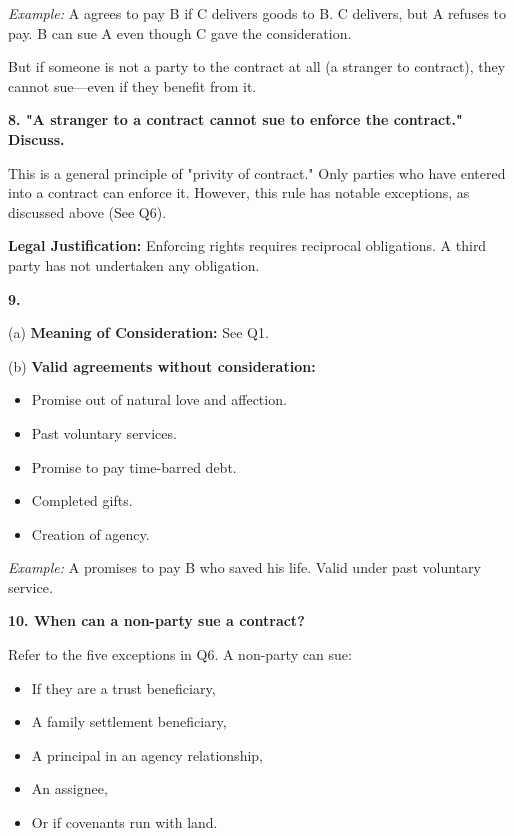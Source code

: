 \documentclass[12pt,a4paper]{book}
\begin{document}
\textit{Example:} A agrees to pay B if C delivers goods to B. C delivers, but A refuses to pay. B can sue A even though C gave the consideration.

But if someone is not a party to the contract at all (a stranger to contract), they cannot sue—even if they benefit from it.

\vspace{0.5cm}
\textbf{8. "A stranger to a contract cannot sue to enforce the contract." Discuss.}

This is a general principle of "privity of contract." Only parties who have entered into a contract can enforce it. However, this rule has notable exceptions, as discussed above (See Q6).

\textbf{Legal Justification:} Enforcing rights requires reciprocal obligations. A third party has not undertaken any obligation.

\vspace{0.5cm}
\textbf{9.}

(a) \textbf{Meaning of Consideration:} See Q1.

(b) \textbf{Valid agreements without consideration:}
\begin{itemize}
    \item Promise out of natural love and affection.
    \item Past voluntary services.
    \item Promise to pay time-barred debt.
    \item Completed gifts.
    \item Creation of agency.
\end{itemize}

\textit{Example:} A promises to pay B who saved his life. Valid under past voluntary service.

\vspace{0.5cm}
\textbf{10. When can a non-party sue a contract?}

Refer to the five exceptions in Q6. A non-party can sue:
\begin{itemize}
    \item If they are a trust beneficiary,
    \item A family settlement beneficiary,
    \item A principal in an agency relationship,
    \item An assignee,
    \item Or if covenants run with land.
\end{itemize}
\end{document}
